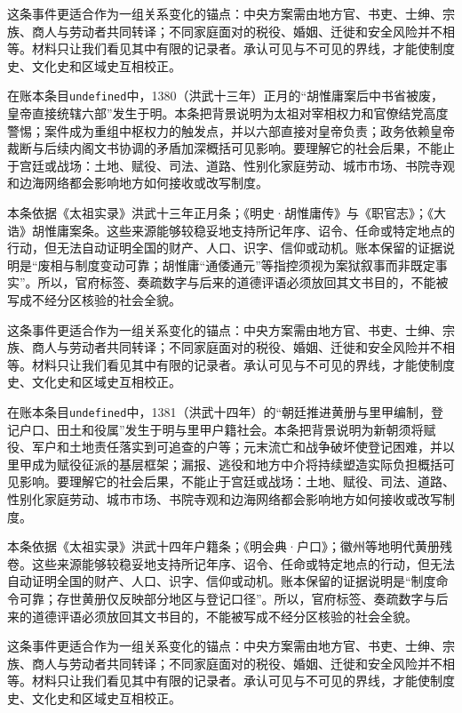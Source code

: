 这条事件更适合作为一组关系变化的锚点：中央方案需由地方官、书吏、士绅、宗族、商人与劳动者共同转译；不同家庭面对的税役、婚姻、迁徙和安全风险并不相等。材料只让我们看见其中有限的记录者。承认可见与不可见的界线，才能使制度史、文化史和区域史互相校正。

在账本条目\texttt{undefined}中，1380（洪武十三年）正月的“胡惟庸案后中书省被废，皇帝直接统辖六部”发生于明。本条把背景说明为太祖对宰相权力和官僚结党高度警惕；案件成为重组中枢权力的触发点，并以六部直接对皇帝负责；政务依赖皇帝裁断与后续内阁文书协调的矛盾加深概括可见影响。要理解它的社会后果，不能止于宫廷或战场：土地、赋役、司法、道路、性别化家庭劳动、城市市场、书院寺观和边海网络都会影响地方如何接收或改写制度。

本条依据《太祖实录》洪武十三年正月条；《明史·胡惟庸传》与《职官志》；《大诰》胡惟庸案条。这些来源能够较稳妥地支持所记年序、诏令、任命或特定地点的行动，但无法自动证明全国的财产、人口、识字、信仰或动机。账本保留的证据说明是“废相与制度变动可靠；胡惟庸“通倭通元”等指控须视为案狱叙事而非既定事实”。所以，官府标签、奏疏数字与后来的道德评语必须放回其文书目的，不能被写成不经分区核验的社会全貌。

这条事件更适合作为一组关系变化的锚点：中央方案需由地方官、书吏、士绅、宗族、商人与劳动者共同转译；不同家庭面对的税役、婚姻、迁徙和安全风险并不相等。材料只让我们看见其中有限的记录者。承认可见与不可见的界线，才能使制度史、文化史和区域史互相校正。

在账本条目\texttt{undefined}中，1381（洪武十四年）的“朝廷推进黄册与里甲编制，登记户口、田土和役属”发生于明与里甲户籍社会。本条把背景说明为新朝须将赋役、军户和土地责任落实到可追查的户等；元末流亡和战争破坏使登记困难，并以里甲成为赋役征派的基层框架；漏报、逃役和地方中介将持续塑造实际负担概括可见影响。要理解它的社会后果，不能止于宫廷或战场：土地、赋役、司法、道路、性别化家庭劳动、城市市场、书院寺观和边海网络都会影响地方如何接收或改写制度。

本条依据《太祖实录》洪武十四年户籍条；《明会典·户口》；徽州等地明代黄册残卷。这些来源能够较稳妥地支持所记年序、诏令、任命或特定地点的行动，但无法自动证明全国的财产、人口、识字、信仰或动机。账本保留的证据说明是“制度命令可靠；存世黄册仅反映部分地区与登记口径”。所以，官府标签、奏疏数字与后来的道德评语必须放回其文书目的，不能被写成不经分区核验的社会全貌。

这条事件更适合作为一组关系变化的锚点：中央方案需由地方官、书吏、士绅、宗族、商人与劳动者共同转译；不同家庭面对的税役、婚姻、迁徙和安全风险并不相等。材料只让我们看见其中有限的记录者。承认可见与不可见的界线，才能使制度史、文化史和区域史互相校正。

